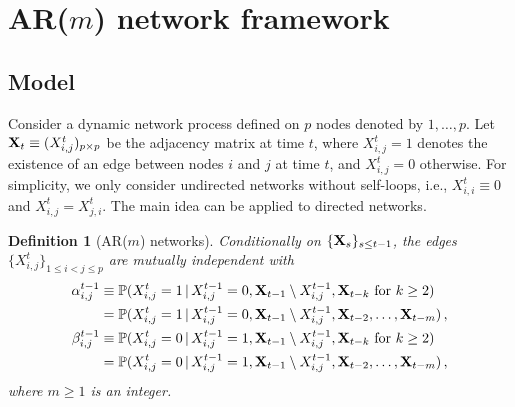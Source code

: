 \documentclass[12pt]{article}
\newtheorem{definition}{Definition}
\newcommand{\bX}{{\bf X}}
\newcommand{\bZ}{{\bf Z}}
\newcommand{\0}{{\bf 0}}
\begin{document}
\section{AR($m$) network framework} \label{sec:sec2}
\subsection{Model}
\label{sec:models}
Consider a dynamic network process defined on  $p$ nodes denoted by $1, \ldots, p$. Let $\bX_t \equiv (X_{i,j}^t)_{p\times p}$ be the adjacency matrix at time $t$, where $X_{i,j}^t =1$ denotes the existence of an edge between nodes $i$ and $j$ at time $t$, and $X_{i,j}^t=0$ otherwise. For simplicity, we only consider undirected networks without self-loops, i.e., $X_{i,i}^t \equiv 0$ and $X_{i,j}^t= X_{j,i}^t$. The main idea can be applied to directed networks.

\begin{definition}[AR($m$) networks] \label{def_AR}
 Conditionally on $\{\bX_{s}\}_{s\leq t-1}$,
the edges $\{X_{i,j}^t\}_{1\le i <j\le p}$ are mutually independent with 
\begin{align} \label{alphaij}
\alpha_{i,j}^{t-1} & \equiv \mathbb{P}(X_{i,j}^t=1\,|\,X_{i,j}^{t-1} =0,  \bX_{t-1}\setminus X_{i,j}^{t-1}, \bX_{t-k}~{\rm for}~k\ge 2)\nonumber\\ 
&= \mathbb{P}(X_{i,j}^t=1\,|\,X_{i,j}^{t-1} =0,  \bX_{t-1}\setminus X_{i,j}^{t-1}, \bX_{t-2}, \ldots, \bX_{t-m})\,,\\
    \label{betaij}
\beta_{i,j}^{t-1} &\equiv \mathbb{P}(X_{i,j}^t=0\,|\,X_{i,j}^{t-1} =1,  \bX_{t-1}\setminus X_{i,j}^{t-1}, \bX_{t-k}~{\rm for}~k\ge 2)\nonumber\\  &
= \mathbb{P}(X_{i,j}^t=0\,|\,X_{i,j}^{t-1} =1,  \bX_{t-1}\setminus X_{i,j}^{t-1},\bX_{t-2}, \ldots, \bX_{t-m})\,,
\end{align}
where $m\ge 1$ is an integer. %
\end{definition}
\end{document}
